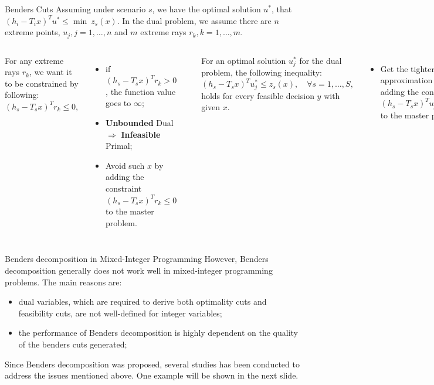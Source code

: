 \documentclass[aspectratio=169]{beamer}
\begin{document}
\begin{frame}{Benders Cuts}
    Assuming under scenario $s$, we have the optimal solution $u^*$, that $(h_i - T_i x)^T u^* \leq \min ~z_s(x)$.  In the dual problem, we assume there are $n$ extreme points, $u_j, j = 1,\dots,n$ and $m$ extreme rays $r_k, k = 1,\dots,m$.
    \vspace{1em}
    \begin{columns}[c]
    
        For any extreme rays $r_k$, we want it to be constrained by following:
        \begin{equation*}
            (h_s - T_s x)^T r_k \leq 0,
        \end{equation*}
        \begin{itemize}[label=$\diamond$]
        \item if $(h_s - T_s x)^T r_k > 0$, the function value goes to $\infty$;
        \item \textbf{Unbounded} Dual $\Rightarrow$ \textbf{Infeasible} Primal;
        \item Avoid such $x$ by adding the constraint $(h_s - T_s x)^T r_k \leq 0$ to the master problem.
        \end{itemize}
        
            \rule{.1mm}{0.6\textheight}
        
        For an optimal solution $u^*_j$ for the dual problem, the following inequality:
        \begin{equation*}
            (h_s - T_s x)^T u^*_j \leq z_s(x), \quad \forall s = 1,\dots,S,
        \end{equation*}
        holds for every feasible decision $y$ with given $x$.
        \begin{itemize}[label=$\diamond$]
            \item Get the tighter lower approximation by keep adding the constraint $(h_s - T_s x)^T u^*_j \leq z_s(x)$ to the master problem
        \end{itemize}
    \end{columns}  
    \end{frame}
    
    \begin{frame}{Benders decomposition in Mixed-Integer Programming}
    However, Benders decomposition generally does not work well in mixed-integer programming problems. The main reasons are:
    \begin{itemize}[label=$\star$]
        \item dual variables, which are required to derive both optimality cuts and feasibility cuts, are not well-defined for integer variables;
        \item the performance of Benders decomposition is highly dependent on the quality of the benders cuts generated;
    \end{itemize}
    Since Benders decomposition was proposed, several studies has been conducted to address the issues mentioned above. One example will be shown in the next slide.
    \end{frame}
    
\end{document}
